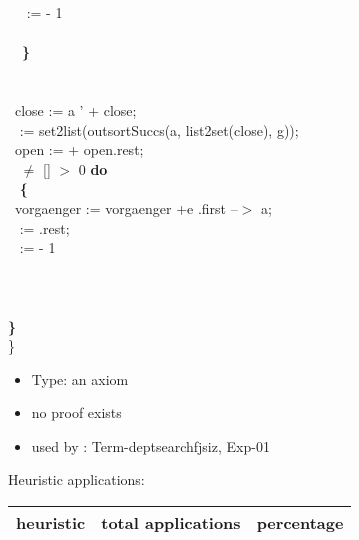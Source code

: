\documentclass[a4paper]{article}
\begin{document}
\tabbe \tabif\ \tabbe \tabif\ \tabbe {}\tabbe {} :=  - 1\\
\tabbe \tabif\ \tabbe \tabif\ \tabbe {}\\
\tabbe \tabif\ \tabbe \tabif\ {\bf \}}\\
\tabbe \tabif\ \\
\tabbe \tabif\ \tabbe  {\bf \{}\\
\tabbe \tabif\ \tabbe \tabbe close := a ' + close;\\
\tabbe \tabif\ \tabbe \tabbe {} := set2list(outsortSuccs(a, list2set(close), g));\\
\tabbe \tabif\ \tabbe \tabbe open :=  + open.rest;\\
\tabbe \tabif\ \tabbe {}  $\neq$ [] \And {} $>$ 0 {\bf do}\\
\tabbe \tabif\ \tabbe \tabbe {} {\bf \{}\\
\tabbe \tabif\ \tabbe \tabbe {}\tabbe vorgaenger := vorgaenger +e .first --$>$ a;\\
\tabbe \tabif\ \tabbe \tabbe {}\tabbe {} := .rest;\\
\tabbe \tabif\ \tabbe \tabbe {}\tabbe {} :=  - 1\\
\tabbe \tabif\ \tabbe \tabbe {}\\
\tabbe \tabif\ \tabbe {\bf \}}\\
\tabbe \tabif\ \\
{\bf \}}\\
\}

\begin{itemize}

\item Type: an axiom

\item       no proof exists
\item       used by      : Term-deptsearchfjsiz, Exp-01
\end{itemize}

\medskip


Heuristic applications:

\begin{supertabular}{l|r|r}
heuristic	& total applications & percentage \\ \hline

\end{supertabular}
\end{document}
